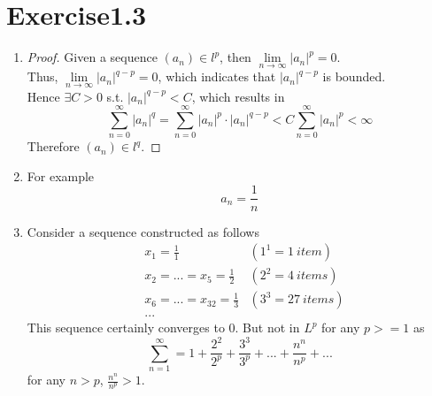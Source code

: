 \documentclass[paper=a4, fontsize=11pt]{scrartcl} %
\numberwithin{equation}{section} %
\numberwithin{figure}{section} %
\numberwithin{table}{section} %
\begin{document}
\section{Exercise1.3}
	\begin{enumerate}
		\item 
			\begin{proof}
				Given a sequence $(a_n) \in l^p$, then $\lim\limits_{n\rightarrow \infty} |a_n|^p =0$.\\
				Thus, $\lim\limits_{n\rightarrow \infty} |a_n|^{q-p} = 0$, which indicates that $|a_n|^{q-p}$ is bounded.\\
				Hence $\exists C > 0$ s.t. $|a_n|^{q-p} < C$, which results in
				\begin{equation}
					\sum_{n=0}^{\infty} |a_n|^q = \sum_{n=0}^{\infty} |a_n|^p \cdot |a_n|^{q-p} < C \sum_{n=0}^{\infty} |a_n|^p < \infty 
				\end{equation}
				Therefore $(a_n) \in l^q$.
			\end{proof}
		\item 
			For example
			\begin{equation}
				a_n = \frac{1}{n}
			\end{equation}
		\item 
			Consider a sequence constructed as follows
			\begin{equation}
				\begin{aligned}
					& x_1 = \frac{1}{1} & (1^1=1 \ item)\\
					& x_2 = ... = x_5 = \frac{1}{2} & (2^2=4 \ items)\\
					& x_6 = ... = x_{32} = \frac{1}{3} & (3^3=27 \ items)\\
					& ...
				\end{aligned}
			\end{equation}
			This sequence certainly converges to 0. But not in $L^p$ for any $p>=1$ as
			\begin{equation}
				\sum_{n=1}^{\infty} = 1 + \frac{2^2}{2^p} + \frac{3^3}{3^p} + ... + \frac{n^n}{n^p} + ...
			\end{equation}
			for any $n > p$, $\frac{n^n}{n^p} > 1$.
	\end{enumerate}
\end{document}
